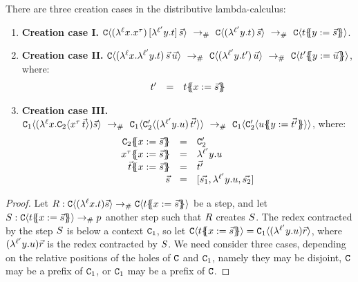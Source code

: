 \begin{lemma}[Creation]
There are three creation cases in the distributive lambda-calculus:
\begin{enumerate}
\item {\bf Creation case I.}
  $
    \con\of{ (\lamp{\lab}{\var}{\var^{\typ}})\,[\lamp{\labtwo}{\vartwo}{\tm}]\, \ls{\tmtwo}}
    \ \todist\ %
    \con\of{ (\lamp{\labtwo}{\vartwo}{\tm})\,\ls{\tmtwo} }
    \ \todist\ %
    \con\of{ \tm\sub{\vartwo}{\ls{\tmtwo}} }
  $.
\item {\bf Creation case II.}
  $
     \con\of{ (\lamp{\lab}{\var}{ \lamp{\labtwo}{\vartwo}{\tm} })\,\ls{\tmtwo}\,\ls{\tmthree} }
     \ \todist\ %
     \con\of{ (\lamp{\labtwo}{\vartwo}{\tm'})\,\ls{\tmthree} }
     \ \todist\ %
     \con\of{ \tm'\sub{\vartwo}{\ls{\tmthree}} }
  $, where:
  \[
     \begin{array}{rcl}
     t' & = & t\{\!\!\{x := \vec{s}\}\!\!\}
     \end{array}
  \]
\item {\bf Creation case III.}
  $
    \con_1\of{(\lamp{\lab}{\var}{\con_2\of{\var^{\typ}\,\ls{\tm}}})\ls{\tmtwo}}
    \ \todist\ %
    \con_1\of{\con'_2\of{(\lamp{\labtwo}{\vartwo}{\tmthree})\,\ls{\tm'}}}
    \ \todist\ %
    \con_1\of{\con'_2\of{\tmthree\sub{\vartwo}{\ls{\tm'}}}}
  $,
  where:
  \[
  \begin{array}{rcl}
    \con_2\sub{\var}{\ls{\tmtwo}}      & = & \con'_2 \\
    \var^{\typ}\sub{\var}{\ls{\tmtwo}} & = & \lamp{\labtwo}{\vartwo}{\tmthree} \\
    \ls{\tm}\sub{\var}{\ls{\tmtwo}}    & = & \ls{\tm'} \\
    \ls{\tmtwo}                        & = & [\ls{\tmtwo_1},\lamp{\labtwo}{\vartwo}{\tmthree},\ls{\tmtwo_2}] \\
  \end{array}
  \]
\end{enumerate}
\end{lemma}
\begin{proof}
Let $R : \mathtt{C}\langle(\lambda^{\ell} x. t)\vec{s}\rangle \mathrel{\to_{\mathtt{\#}}} \mathtt{C}\langle t\{\!\!\{x := \vec{s}\}\!\!\}\rangle$ be a step,
and let $S : \mathtt{C}\langle t\{\!\!\{x := \vec{s}\}\!\!\}\rangle \mathrel{\to_{\mathtt{\#}}} p$ another step
such that $R$ creates $S$.
The redex contracted by the step $S$ is below a context $\mathtt{C}_1$,
so let $\mathtt{C}\langle t\{\!\!\{x := \vec{s}\}\!\!\}\rangle = \mathtt{C}_1\langle(\lambda^{\ell'} y. u)\vec{r}\rangle$,
where $(\lambda^{\ell'} y. u)\vec{r}$ is the redex contracted by $S$.
We need consider three cases, depending on the relative positions of the holes of $\mathtt{C}$ and $\mathtt{C}_1$,
namely they may be disjoint,
$\mathtt{C}$ may be a prefix of $\mathtt{C}_1$,
or $\mathtt{C}_1$ may be a prefix of $\mathtt{C}$.
\end{proof}


